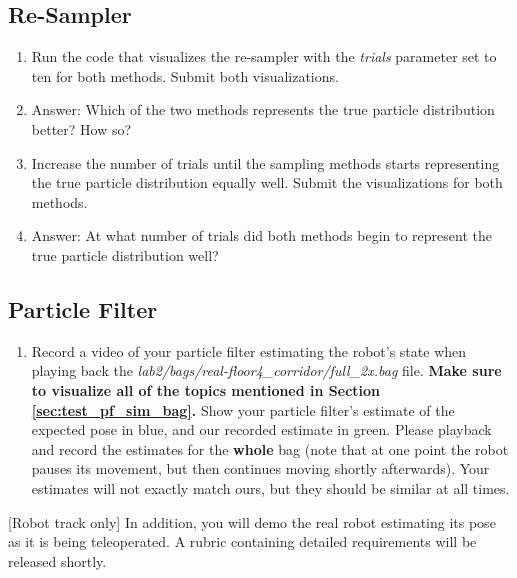 \documentclass[final]{article}
\begin{document}
\subsection{Re-Sampler}
\begin{enumerate}
\item Run the code that visualizes the re-sampler with the \textit{trials} parameter set to ten for both methods. Submit both visualizations.
\item Answer: Which of the two methods represents the true particle distribution better? How so?
\item Increase the number of trials until the sampling methods starts representing the true particle distribution equally well. Submit the visualizations for both methods.
\item Answer: At what number of trials did both methods begin to represent the true particle distribution well?
\end{enumerate}

\subsection{Particle Filter}
\begin{enumerate}
\item Record a video of your particle filter estimating the robot's state when playing back the \textit{lab2/bags/real-floor4\_corridor/full\_2x.bag} file. \textbf{Make sure to visualize all of the topics mentioned in Section \ref{sec:test_pf_sim_bag}.} Show your particle filter's estimate of the expected pose in blue, and our recorded estimate in green. Please playback and record the estimates for the \textbf{whole} bag (note that at one point the robot pauses its movement, but then continues moving shortly afterwards). Your estimates will not exactly match ours, but they should be similar at all times.

\end{enumerate}

[Robot track only] In addition, you will demo the real robot estimating its pose as it is being teleoperated. A rubric containing detailed requirements will be released shortly.
\end{document}
